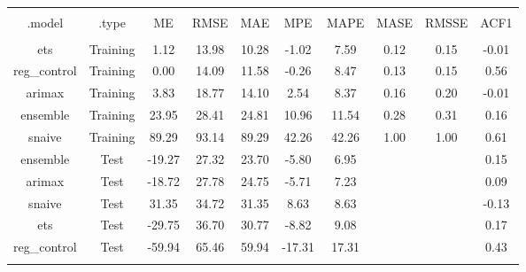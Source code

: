 
\begin{table}[!htbp] \centering 
  \caption{} 
  \label{} 
\begin{tabular}{@{\extracolsep{5pt}} cccccccccc} 
\\[-1.8ex]\hline 
\hline \\[-1.8ex] 
.model & .type & ME & RMSE & MAE & MPE & MAPE & MASE & RMSSE & ACF1 \\ 
\hline \\[-1.8ex] 
ets & Training &   1.12 & 13.98 & 10.28 &  -1.02 &  7.59 & 0.12 & 0.15 & -0.01 \\ 
reg\_control & Training &   0.00 & 14.09 & 11.58 &  -0.26 &  8.47 & 0.13 & 0.15 &  0.56 \\ 
arimax & Training &   3.83 & 18.77 & 14.10 &   2.54 &  8.37 & 0.16 & 0.20 & -0.01 \\ 
ensemble & Training &  23.95 & 28.41 & 24.81 &  10.96 & 11.54 & 0.28 & 0.31 &  0.16 \\ 
snaive & Training &  89.29 & 93.14 & 89.29 &  42.26 & 42.26 & 1.00 & 1.00 &  0.61 \\ 
ensemble & Test & -19.27 & 27.32 & 23.70 &  -5.80 &  6.95 &  &  &  0.15 \\ 
arimax & Test & -18.72 & 27.78 & 24.75 &  -5.71 &  7.23 &  &  &  0.09 \\ 
snaive & Test &  31.35 & 34.72 & 31.35 &   8.63 &  8.63 &  &  & -0.13 \\ 
ets & Test & -29.75 & 36.70 & 30.77 &  -8.82 &  9.08 &  &  &  0.17 \\ 
reg\_control & Test & -59.94 & 65.46 & 59.94 & -17.31 & 17.31 &  &  &  0.43 \\ 
\hline \\[-1.8ex] 
\end{tabular} 
\end{table} 
